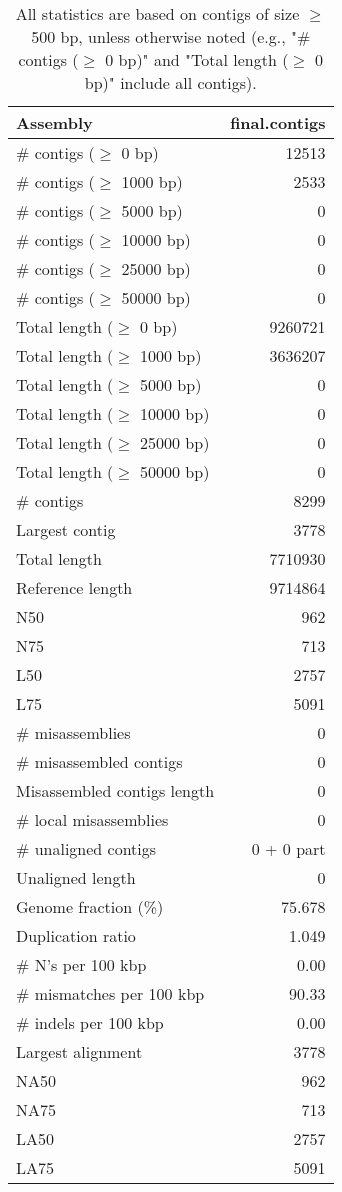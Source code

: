 \documentclass[12pt,a4paper]{article}
\begin{document}
\begin{table}[ht]
\begin{center}
\caption{All statistics are based on contigs of size $\geq$ 500 bp, unless otherwise noted (e.g., "\# contigs ($\geq$ 0 bp)" and "Total length ($\geq$ 0 bp)" include all contigs).}
\begin{tabular}{|l*{1}{|r}|}
\hline
Assembly & final.contigs \\ \hline
\# contigs ($\geq$ 0 bp) & 12513 \\ \hline
\# contigs ($\geq$ 1000 bp) & 2533 \\ \hline
\# contigs ($\geq$ 5000 bp) & 0 \\ \hline
\# contigs ($\geq$ 10000 bp) & 0 \\ \hline
\# contigs ($\geq$ 25000 bp) & 0 \\ \hline
\# contigs ($\geq$ 50000 bp) & 0 \\ \hline
Total length ($\geq$ 0 bp) & 9260721 \\ \hline
Total length ($\geq$ 1000 bp) & 3636207 \\ \hline
Total length ($\geq$ 5000 bp) & 0 \\ \hline
Total length ($\geq$ 10000 bp) & 0 \\ \hline
Total length ($\geq$ 25000 bp) & 0 \\ \hline
Total length ($\geq$ 50000 bp) & 0 \\ \hline
\# contigs & 8299 \\ \hline
Largest contig & 3778 \\ \hline
Total length & 7710930 \\ \hline
Reference length & 9714864 \\ \hline
N50 & 962 \\ \hline
N75 & 713 \\ \hline
L50 & 2757 \\ \hline
L75 & 5091 \\ \hline
\# misassemblies & 0 \\ \hline
\# misassembled contigs & 0 \\ \hline
Misassembled contigs length & 0 \\ \hline
\# local misassemblies & 0 \\ \hline
\# unaligned contigs & 0 + 0 part \\ \hline
Unaligned length & 0 \\ \hline
Genome fraction (\%) & 75.678 \\ \hline
Duplication ratio & 1.049 \\ \hline
\# N's per 100 kbp & 0.00 \\ \hline
\# mismatches per 100 kbp & 90.33 \\ \hline
\# indels per 100 kbp & 0.00 \\ \hline
Largest alignment & 3778 \\ \hline
NA50 & 962 \\ \hline
NA75 & 713 \\ \hline
LA50 & 2757 \\ \hline
LA75 & 5091 \\ \hline
\end{tabular}
\end{center}
\end{table}
\end{document}
